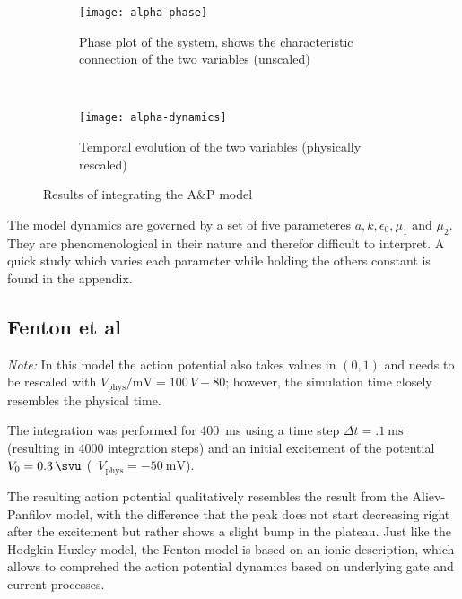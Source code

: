 \begin{figure}[h]
    \centering
    \begin{subfigure}[b]{.45\textwidth}
        \texttt{[image: alpha-phase]}
        \vspace{-\baselineskip}
        \label{fig:alphaphase}
        \caption{Phase plot of the system, shows the characteristic connection
        of the two variables (unscaled)}
    \end{subfigure}
    ~
    \begin{subfigure}[b]{.45\textwidth}
        \texttt{[image: alpha-dynamics]}
        \vspace{-\baselineskip}
        \label{fig:alphadyn}
        \caption{Temporal evolution of the two variables (physically rescaled)}
    \end{subfigure}
    \label{fig:alpha1}
    \caption{Results of integrating the A\&P model}
\end{figure}

The model dynamics are governed by a set of five parameteres $a, k, \epsilon_0,
\mu_1\text{ and }\mu_2$. They are phenomenological in their nature and therefor
difficult to interpret. A quick study which varies each parameter while holding
the others constant is found in the appendix.


\subsection{Fenton et al}
\emph{Note:} In this model the action potential also takes values in $(0,1)$
and needs to be rescaled with $V_{\mathrm{phys}}/\si{\milli\volt}=100\,V-80$;
however, the simulation time closely resembles the physical time.

\vspace{\baselineskip}
The integration was performed for \SI{400}{\milli\second} using a time step
$\Delta{t}=\SI{.1}{\milli\second}$ (resulting in 4000 integration steps) and
an initial excitement of the potential $V_0=\SI{.3}{\svu}$
(\ie~$V_{\mathrm{phys}}=\SI{-50}{\milli\volt}$).

The resulting action potential qualitatively resembles the result from the
Aliev-Panfilov model, with the difference that the peak does not start
decreasing right after the excitement but rather shows a slight bump in the
plateau.
Just like the Hodgkin-Huxley model, the Fenton model is  based on an ionic
description, which allows to comprehed the action potential dynamics based on
underlying gate and current processes.

